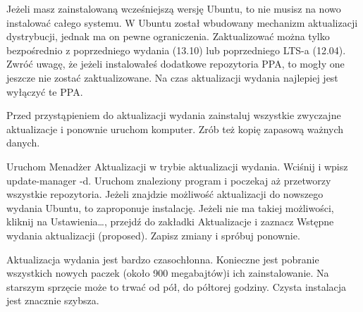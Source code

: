 Jeżeli masz zainstalowaną wcześniejszą wersję Ubuntu, to nie musisz na nowo instalować całego systemu. W Ubuntu został wbudowany mechanizm aktualizacji dystrybucji, jednak ma on pewne ograniczenia. Zaktualizować można tylko bezpośrednio z poprzedniego wydania (13.10) lub poprzedniego LTS-a (12.04). Zwróć uwagę, że jeżeli instalowałeś dodatkowe repozytoria PPA, to mogły one jeszcze nie zostać zaktualizowane. Na czas aktualizacji wydania najlepiej jest wyłączyć te PPA.

Przed przystąpieniem do aktualizacji wydania zainstaluj wszystkie zwyczajne aktualizacje i ponownie uruchom komputer. Zrób też kopię zapasową ważnych danych.

Uruchom Menadżer Aktualizacji w trybie aktualizacji wydania. Wciśnij  i wpisz \textcolor{ubuntu_orange}{update-manager -d}. Uruchom znaleziony program i poczekaj aż przetworzy wszystkie repozytoria. Jeżeli znajdzie możliwość aktualizacji do nowszego wydania Ubuntu, to zaproponuje instalację. Jeżeli nie ma takiej możliwości, kliknij na \textcolor{ubuntu_orange}{Ustawienia\ldots}, przejdź do zakładki \textcolor{ubuntu_orange}{Aktualizacje} i zaznacz \textcolor{ubuntu_orange}{Wstępne wydania aktualizacji (proposed)}. Zapisz zmiany i spróbuj ponownie.

Aktualizacja wydania jest bardzo czasochłonna. Konieczne jest pobranie wszystkich nowych paczek (około 900 megabajtów)i ich zainstalowanie. Na starszym sprzęcie może to trwać od pół, do półtorej godziny. Czysta instalacja jest znacznie szybsza.

